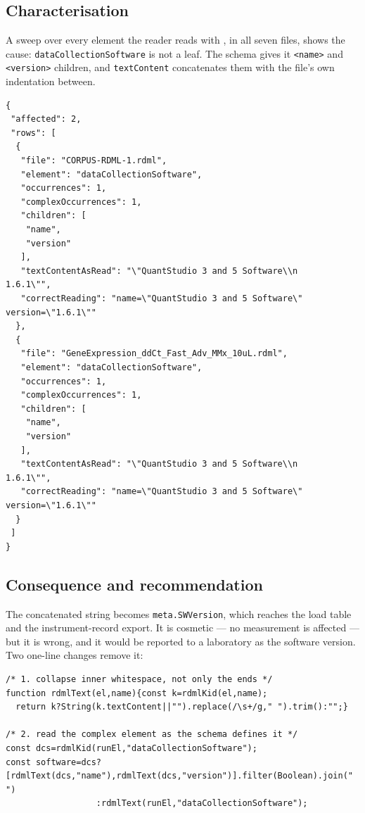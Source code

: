 \subsection*{Characterisation}
A sweep over every element the reader reads with , in all seven files, shows the cause:
\texttt{dataCollectionSoftware} is not a leaf. The schema gives it \texttt{<name>} and
\texttt{<version>} children, and \texttt{textContent} concatenates them with the file's own
indentation between.

\begin{lstlisting}[style=jstiny]
{
 "affected": 2,
 "rows": [
  {
   "file": "CORPUS-RDML-1.rdml",
   "element": "dataCollectionSoftware",
   "occurrences": 1,
   "complexOccurrences": 1,
   "children": [
    "name",
    "version"
   ],
   "textContentAsRead": "\"QuantStudio 3 and 5 Software\\n                1.6.1\"",
   "correctReading": "name=\"QuantStudio 3 and 5 Software\" version=\"1.6.1\""
  },
  {
   "file": "GeneExpression_ddCt_Fast_Adv_MMx_10uL.rdml",
   "element": "dataCollectionSoftware",
   "occurrences": 1,
   "complexOccurrences": 1,
   "children": [
    "name",
    "version"
   ],
   "textContentAsRead": "\"QuantStudio 3 and 5 Software\\n                1.6.1\"",
   "correctReading": "name=\"QuantStudio 3 and 5 Software\" version=\"1.6.1\""
  }
 ]
}
\end{lstlisting}


\subsection*{Consequence and recommendation}
The concatenated string becomes \texttt{meta.SWVersion}, which reaches the load table and the
instrument-record export. It is cosmetic --- no measurement is affected --- but it is wrong, and it
would be reported to a laboratory as the software version. Two one-line changes remove it:

\begin{lstlisting}[style=js]
/* 1. collapse inner whitespace, not only the ends */
function rdmlText(el,name){const k=rdmlKid(el,name);
  return k?String(k.textContent||"").replace(/\s+/g," ").trim():"";}

/* 2. read the complex element as the schema defines it */
const dcs=rdmlKid(runEl,"dataCollectionSoftware");
const software=dcs?[rdmlText(dcs,"name"),rdmlText(dcs,"version")].filter(Boolean).join(" ")
                  :rdmlText(runEl,"dataCollectionSoftware");
\end{lstlisting}

